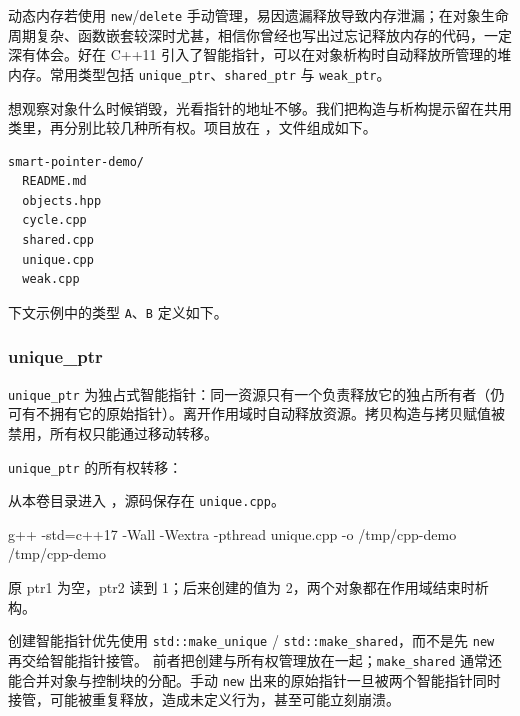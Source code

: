 动态内存若使用 \texttt{new}/\texttt{delete} 手动管理，易因遗漏释放导致内存泄漏；在对象生命周期复杂、函数嵌套较深时尤甚，相信你曾经也写出过忘记释放内存的代码，一定深有体会。好在 C++11 引入了智能指针，可以在对象析构时自动释放所管理的堆内存。常用类型包括 \texttt{unique\_ptr}、\texttt{shared\_ptr} 与 \texttt{weak\_ptr}。

想观察对象什么时候销毁，光看指针的地址不够。我们把构造与析构提示留在共用类里，再分别比较几种所有权。项目放在 ，文件组成如下。
\begin{lstlisting}[language={}]
smart-pointer-demo/
  README.md
  objects.hpp
  cycle.cpp
  shared.cpp
  unique.cpp
  weak.cpp
\end{lstlisting}

下文示例中的类型 \texttt{A}、\texttt{B} 定义如下。



\subsubsection{unique\_ptr}
\texttt{unique\_ptr} 为独占式智能指针：同一资源只有一个负责释放它的独占所有者（仍可有不拥有它的原始指针）。离开作用域时自动释放资源。拷贝构造与拷贝赋值被禁用，所有权只能通过移动转移。

\begin{example}
\texttt{unique\_ptr} 的所有权转移：



从本卷目录进入 ，源码保存在 \texttt{unique.cpp}。
\begin{tbash}
g++ -std=c++17 -Wall -Wextra -pthread unique.cpp -o /tmp/cpp-demo
/tmp/cpp-demo
\end{tbash}
原 ptr1 为空，ptr2 读到 1；后来创建的值为 2，两个对象都在作用域结束时析构。
\end{example}

\begin{note}
创建智能指针优先使用 \texttt{std::make\_unique} / \texttt{std::make\_shared}，而不是先 \texttt{new} 再交给智能指针接管。
前者把创建与所有权管理放在一起；\texttt{make\_shared} 通常还能合并对象与控制块的分配。手动 \texttt{new} 出来的原始指针一旦被两个智能指针同时接管，可能被重复释放，造成未定义行为，甚至可能立刻崩溃。
\end{note}


